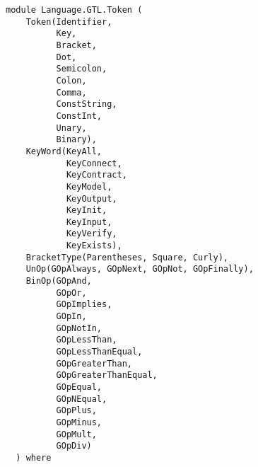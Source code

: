 \label{module:Language.GTL.Token}
\haddockbeginheader
{\haddockverb\begin{verbatim}
module Language.GTL.Token (
    Token(Identifier,
          Key,
          Bracket,
          Dot,
          Semicolon,
          Colon,
          Comma,
          ConstString,
          ConstInt,
          Unary,
          Binary), 
    KeyWord(KeyAll,
            KeyConnect,
            KeyContract,
            KeyModel,
            KeyOutput,
            KeyInit,
            KeyInput,
            KeyVerify,
            KeyExists), 
    BracketType(Parentheses, Square, Curly), 
    UnOp(GOpAlways, GOpNext, GOpNot, GOpFinally), 
    BinOp(GOpAnd,
          GOpOr,
          GOpImplies,
          GOpIn,
          GOpNotIn,
          GOpLessThan,
          GOpLessThanEqual,
          GOpGreaterThan,
          GOpGreaterThanEqual,
          GOpEqual,
          GOpNEqual,
          GOpPlus,
          GOpMinus,
          GOpMult,
          GOpDiv)
  ) where\end{verbatim}}
\haddockendheader

